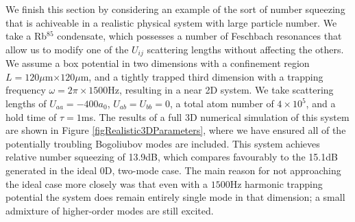 \documentclass{iopart}
\begin{document}

We finish this section by considering an example of the sort of number squeezing that is achiveable in a realistic physical system with large particle number. We take a Rb$^{85}$ condensate, which possesses a number of Feschbach resonances that allow us to modify one of the $U_{ij}$ scattering lengths without affecting the others. We assume a box potential in two dimensions with a confinement region $L=120\mu$m$\times 120\mu$m, and a tightly trapped third dimension with a trapping frequency $\omega=2 \pi \times 1500$Hz, resulting in a near 2D system. We take scattering lengths of $U_{aa}=-400 a_0$, $U_{ab}=U_{bb}=0$, a total atom number of $4\times 10^5$, and a hold time of $\tau=1$ms. The results of a full 3D numerical simulation of this system are shown in Figure \ref{figRealistic3DParameters}, where we have ensured all of the potentially troubling Bogoliubov modes are included. This system achieves relative number squeezing of 13.9dB, which compares favourably to the 15.1dB generated in the ideal 0D, two-mode case. The main reason for not approaching the ideal case more closely was that even with a $1500$Hz harmonic trapping potential the system does remain entirely single mode in that dimension; a small admixture of higher-order modes are still excited. 
\end{document}
